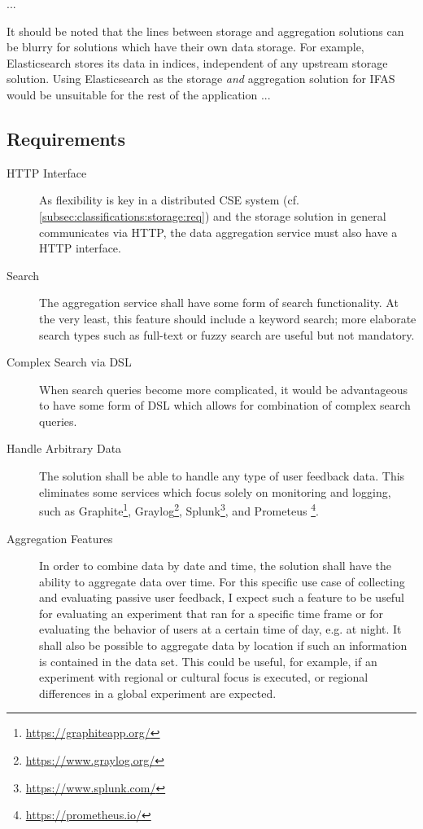 ...

It should be noted that the lines between storage and aggregation solutions can be blurry for solutions which have their own data storage.
For example, Elasticsearch stores its data in indices, independent of any upstream storage solution.
Using Elasticsearch as the storage \emph{and} aggregation solution for \ac{IFAS} would be unsuitable for the rest of the application ...


\subsection{Requirements}


\begin{description}
\item [HTTP Interface]
As flexibility is key in a distributed \ac{CSE} system (cf. \cref{subsec:classifications:storage:req}) and the storage solution in general communicates via HTTP, the data aggregation service must also have a HTTP interface.
\item [Search]
The aggregation service shall have some form of search functionality.
At the very least, this feature should include a keyword search; more elaborate search types such as full-text or fuzzy search are useful but not mandatory.
\item [Complex Search via DSL]
When search queries become more complicated, it would be advantageous to have some form of \ac{DSL} which allows for combination of complex search queries.
\item [Handle Arbitrary Data]
The solution shall be able to handle any type of user feedback data.
This eliminates some services which focus solely on monitoring and logging, such as Graphite\footnote{\url{https://graphiteapp.org/}}, Graylog\footnote{\url{https://www.graylog.org/}}, Splunk\footnote{\url{https://www.splunk.com/}}, and Prometeus \footnote{\url{https://prometheus.io/}}.
\item [Aggregation Features]
In order to combine data by date and time, the solution shall have the ability to aggregate data over time.
For this specific use case of collecting and evaluating passive user feedback, I expect such a feature to be useful for evaluating an experiment that ran for a specific time frame or for evaluating the behavior of users at a certain time of day, e.g. at night.
It shall also be possible to aggregate data by location if such an information is contained in the data set.
This could be useful, for example, if an experiment with regional or cultural focus is executed, or regional differences in a global experiment are expected.

\end{description}
